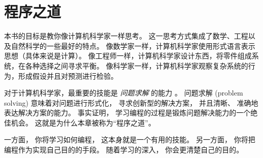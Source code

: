 



\chapter{程序之道}


本书的目标是教你像计算机科学家一样思考。  
这一思考方式集成了数学、工程以及自然科学的一些最好的特点。  
像数学家一样，计算机科学家使用形式语言表示思想（具体来说是计算）。  
像工程师一样，计算机科学家设计东西，将零件组成系统，在各种选择之间寻求平衡。  
像科学家一样，计算机科学家观察复杂系统的行为，形成假设并且对预测进行检验。  



对于计算机科学家，最重要的技能是 {\em 问题求解} 的能力 。  
问题求解 (problem solving) 意味着对问题进行形式化， 寻求创新型的解决方案， 
并且清晰、 准确地表达解决方案的能力。  
事实证明， 学习编程的过程是锻炼问题解决能力的一个绝佳机会。  
这就是为什么本章被称为``程序之道''。


一方面， 你将学习如何编程， 这本身就是一个有用的技能。  
另一方面， 你将把编程作为实现自己目的的手段。  
随着学习的深入， 你会更清楚自己的目的。

